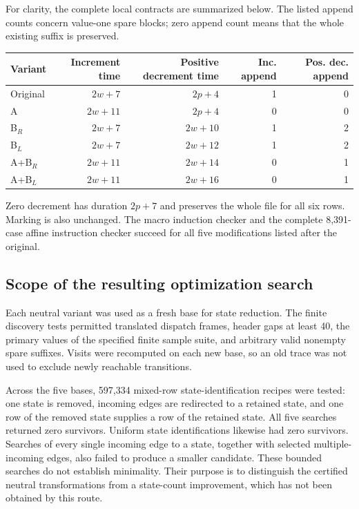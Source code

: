 For clarity, the complete local contracts are summarized below.
The listed append counts concern value-one spare blocks; zero
append count means that the whole existing suffix is preserved.
\begin{center}
\begin{tabular}{lrrrr}
\hline
Variant & Increment time & Positive decrement time
 & Inc. append & Pos. dec. append\\
\hline
Original & $2w+7$ & $2p+4$ & 1 & 0\\
A & $2w+11$ & $2p+4$ & 0 & 0\\
B$_R$ & $2w+7$ & $2w+10$ & 1 & 2\\
B$_L$ & $2w+7$ & $2w+12$ & 1 & 2\\
A+B$_R$ & $2w+11$ & $2w+14$ & 0 & 1\\
A+B$_L$ & $2w+11$ & $2w+16$ & 0 & 1\\
\hline
\end{tabular}
\end{center}
Zero decrement has duration $2p+7$ and preserves the whole file for
all six rows.  Marking is also unchanged.  The macro induction checker
and the complete 8,391-case affine instruction checker succeed for
all five modifications listed after the original.

\subsection{Scope of the resulting optimization search}

Each neutral variant was used as a fresh base for state reduction.
The finite discovery tests permitted translated dispatch frames,
header gaps at least 40, the primary values of the specified finite
sample suite, and arbitrary valid nonempty spare suffixes.  Visits
were recomputed on each new base, so an old trace was not used to
exclude newly reachable transitions.

Across the five bases, 597,334 mixed-row state-identification recipes
were tested: one state is removed, incoming edges are redirected to
a retained state, and one row of the removed state supplies a row of
the retained state.  All five searches returned zero survivors.
Uniform state identifications likewise had zero survivors.  Searches
of every single incoming edge to a state, together with selected
multiple-incoming edges, also failed to produce a smaller candidate.
These bounded searches do not establish minimality.  Their purpose
is to distinguish the certified neutral transformations from a
state-count improvement, which has not been obtained by this route.

